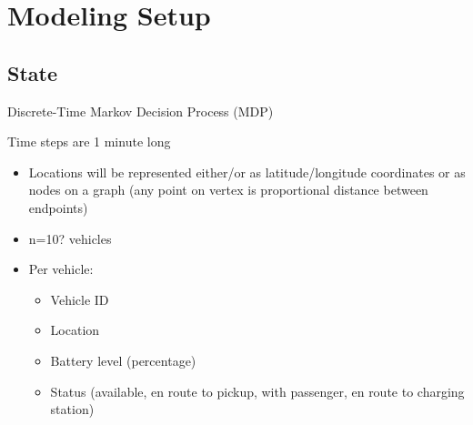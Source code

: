 \documentclass[12pt]{article}
\begin{document}
\psetheader %

\section*{Modeling Setup}
\subsection*{State}
Discrete-Time Markov Decision Process (MDP)

Time steps are 1 minute long

\begin{itemize}
		\item Locations will be represented either/or as latitude/longitude coordinates or as
				nodes on a graph (any point on vertex is proportional distance between endpoints)
\end{itemize}
\begin{itemize}
		\item n=10? vehicles
		\item Per vehicle:
    \begin{itemize}
						\item Vehicle ID
						\item Location
						\item Battery level (percentage)
						\item Status (available, en route to pickup, with passenger, en route to charging station)
    \end{itemize}
\end{itemize}
\end{document}
